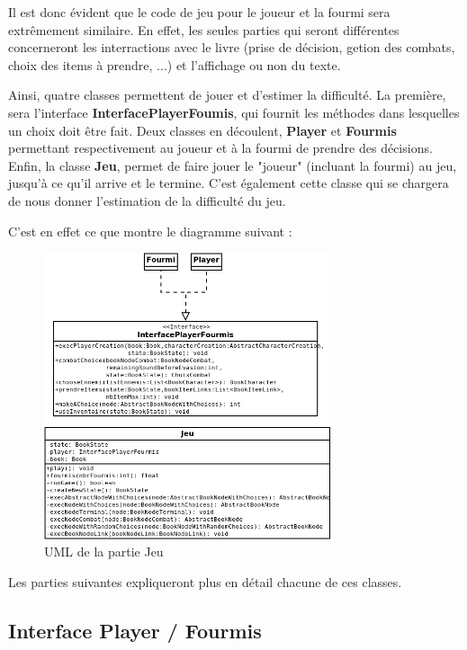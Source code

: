 		Il est donc évident que le code de jeu pour le joueur et la fourmi sera extrêmement similaire. En effet, les seules parties qui seront différentes concerneront les interractions avec le livre (prise de décision, getion des combats, choix des items à prendre, ...) et l'affichage ou non du texte.

		Ainsi, quatre classes permettent de jouer et d'estimer la difficulté. La première, sera l'interface \textbf{InterfacePlayerFoumis}, qui fournit les méthodes dans lesquelles un choix doit être fait. Deux classes en découlent, \textbf{Player} et \textbf{Fourmis} permettant respectivement au joueur et à la fourmi de prendre des décisions. Enfin, la classe \textbf{Jeu}, permet de faire jouer le "joueur" (incluant la fourmi) au jeu, jusqu'à ce qu'il arrive et le termine. C'est également cette classe qui se chargera de nous donner l'estimation de la difficulté du jeu.

		C'est en effet ce que montre le diagramme suivant :

		\begin{figure}[H]
			\centering\includegraphics[width=0.75\textwidth, keepaspectratio]{img/FourmiPlayer.png}
			\caption{UML de la partie Jeu}
		\end{figure}

		Les parties suivantes expliqueront plus en détail chacune de ces classes.

		\subsection{Interface Player / Fourmis}

